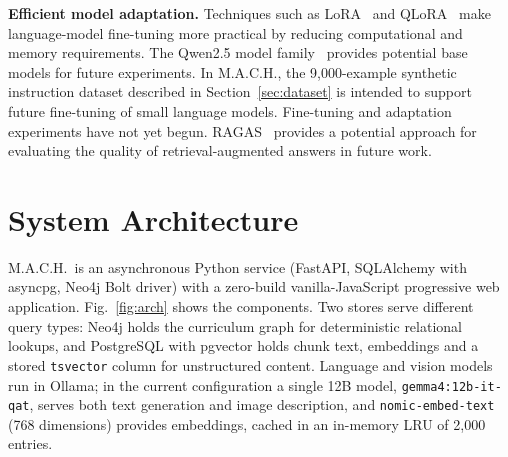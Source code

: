 \documentclass[conference]{IEEEtran}
\newcommand{\code}[1]{\texttt{\small #1}}
\begin{document}
\textbf{Efficient model adaptation.}
Techniques such as LoRA~\cite{hu2022} and QLoRA~\cite{dettmers2023} make language-model fine-tuning more practical by reducing computational and memory requirements. The Qwen2.5 model family~\cite{qwen2024} provides potential base models for future experiments. In M.A.C.H., the 9,000-example synthetic instruction dataset described in Section~\ref{sec:dataset} is intended to support future fine-tuning of small language models. Fine-tuning and adaptation experiments have not yet begun. RAGAS~\cite{es2024} provides a potential approach for evaluating the quality of retrieval-augmented answers in future work.

\section{System Architecture}\label{sec:arch}
M.A.C.H.\ is an asynchronous Python service (FastAPI, SQLAlchemy with asyncpg, Neo4j Bolt driver) with a zero-build vanilla-JavaScript progressive web application. Fig.~\ref{fig:arch} shows the components. Two stores serve different query types: Neo4j holds the curriculum graph for deterministic relational lookups, and PostgreSQL with pgvector holds chunk text, embeddings and a stored \code{tsvector} column for unstructured content. Language and vision models run in Ollama; in the current configuration a single 12B model, \code{gemma4:12b-it-qat}, serves both text generation and image description, and \code{nomic-embed-text} (768 dimensions) provides embeddings, cached in an in-memory LRU of 2,000 entries.
\end{document}
